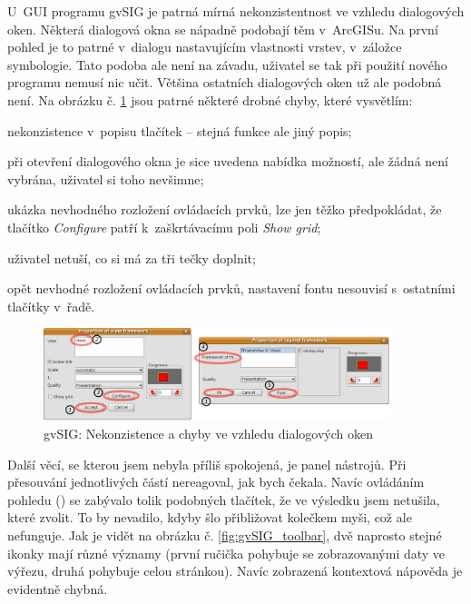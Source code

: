 \documentclass[a4paper,12pt,draft]{article}
\begin{document}
U~GUI programu gvSIG je patrná mírná
nekonzistentnost ve vzhledu dialogových oken. Některá dialogová okna se
nápadně podobají těm v~ArcGISu. Na první pohled je to patrné v~dialogu
nastavujícím vlastnosti vrstev, v~záložce symbologie. Tato podoba ale
není na závadu, uživatel se tak při použití nového programu nemusí
nic učit. Většina ostatních dialogových oken už ale podobná není. Na
obrázku č. \ref{fig:gvSIG_dialogy} jsou patrné některé drobné chyby,
které vysvětlím:
\begin{inparaenum}[\itshape 1\upshape)]
\item nekonzistence v~popisu tlačítek -- stejná funkce ale jiný popis;
\item při otevření dialogového okna je sice uvedena nabídka možností,
ale žádná není vybrána, uživatel si toho nevšimne;
\item ukázka nevhodného rozložení ovládacích prvků, lze jen těžko
předpokládat, že tlačítko \emph{Configure} patří k~zaškrtávacímu
poli \emph{Show grid};
\item uživatel netuší, co si má za tři tečky doplnit;
\item opět nevhodné rozložení ovládacích prvků, nastavení fontu
nesouvisí s~ostatními tlačítky v~řadě.
\end{inparaenum}

\begin{figure}[h!]
\centering
\includegraphics[width=0.9\textwidth]{./GUI_screenshots/gvSIG_dialogy.png}
\caption{gvSIG: Nekonzistence a chyby ve vzhledu dialogových oken}
\label{fig:gvSIG_dialogy}
\end{figure}

Další věcí, se kterou jsem nebyla příliš spokojená, je panel
nástrojů. Při pře\-souvání jednotlivých částí nereagoval, jak bych
čekala. Navíc ovládáním pohledu () se zabývalo tolik
podobných tlačítek, že ve výsledku jsem netušila, které zvolit. To by
nevadilo, kdyby šlo přibližovat kolečkem myši, což ale nefunguje. Jak je
vidět na obrázku č. \ref{fig:gvSIG_toolbar}, dvě naprosto stejné ikonky
mají různé významy (první ručička pohybuje se zobrazovanými daty ve
výřezu, druhá pohybuje celou stránkou). Navíc zobrazená kontextová
nápověda je evidentně chybná.
\end{document}
